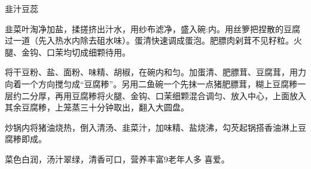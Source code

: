 \begin{recipe}{韭汁豆蕊}

\ingredients


\cooking

\step 韭菜叶淘净加盐，揉搓挤出汁水，用纱布滤净，盛入碗:内。用丝箩把捏散的豆腐过一道（先入热水内除去砠水味）。蛋清快速调成蛋泡。肥膘肉剁茸不见籽粒。火腿、金钩、口茉均切成细颗待用。

\step 将干豆粉、盐、面粉、味精、胡椒，在碗内和匀。加蛋清、肥膘茸、豆腐茸，用力向着一个方向搅匀成“豆腐糁”。另用二鱼碗一个先抹一点猪肥膘茸，糊上豆腐糁一层约二分厚，再用豆腐糁将火腿、金钩、口茉细颗混合调匀、放入中心，上面放入其余豆腐糁，上笼蒸三十分钟取出，翻入大圆盘。

\step 炒锅内将猪油烧热，倒入清汤、韭菜汁，加味精、盐烧沸，勾芡起锅搭香油淋上豆腐糁即成。

\notes

菜色白润，汤汁翠绿，清香可口，营养丰富9老年人多 喜爱。

\end{recipe}

